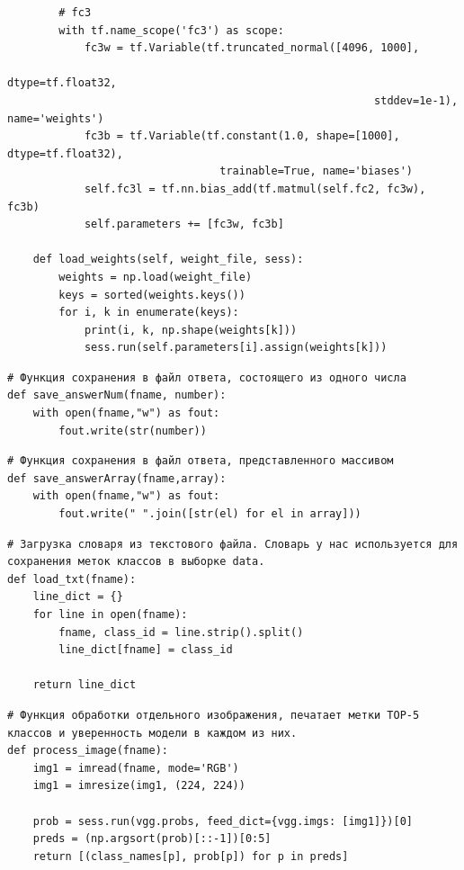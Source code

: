 \documentclass[11pt,a4paper]{article}
\begin{document}
\begin{verbatim}
        # fc3
        with tf.name_scope('fc3') as scope:
            fc3w = tf.Variable(tf.truncated_normal([4096, 1000],
                                                         dtype=tf.float32,
                                                         stddev=1e-1), name='weights')
            fc3b = tf.Variable(tf.constant(1.0, shape=[1000], dtype=tf.float32),
                                 trainable=True, name='biases')
            self.fc3l = tf.nn.bias_add(tf.matmul(self.fc2, fc3w), fc3b)
            self.parameters += [fc3w, fc3b]

    def load_weights(self, weight_file, sess):
        weights = np.load(weight_file)
        keys = sorted(weights.keys())
        for i, k in enumerate(keys):
            print(i, k, np.shape(weights[k]))
            sess.run(self.parameters[i].assign(weights[k]))
\end{verbatim}

\begin{verbatim}
# Функция сохранения в файл ответа, состоящего из одного числа
def save_answerNum(fname, number):
    with open(fname,"w") as fout:
        fout.write(str(number))
\end{verbatim}

\begin{verbatim}
# Функция сохранения в файл ответа, представленного массивом
def save_answerArray(fname,array):
    with open(fname,"w") as fout:
        fout.write(" ".join([str(el) for el in array]))
\end{verbatim}

\begin{verbatim}
# Загрузка словаря из текстового файла. Словарь у нас используется для сохранения меток классов в выборке data.
def load_txt(fname):
    line_dict = {}
    for line in open(fname):
        fname, class_id = line.strip().split()
        line_dict[fname] = class_id

    return line_dict
\end{verbatim}

\begin{verbatim}
# Функция обработки отдельного изображения, печатает метки TOP-5 классов и уверенность модели в каждом из них.
def process_image(fname):
    img1 = imread(fname, mode='RGB')
    img1 = imresize(img1, (224, 224))
    
    prob = sess.run(vgg.probs, feed_dict={vgg.imgs: [img1]})[0]
    preds = (np.argsort(prob)[::-1])[0:5]
    return [(class_names[p], prob[p]) for p in preds]
\end{verbatim}
\end{document}
